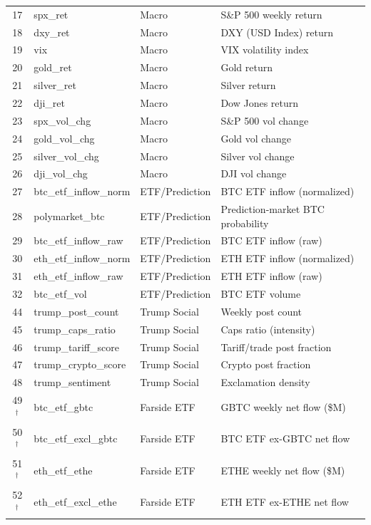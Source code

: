 \begin{table}[hp]
\begin{tabular}{clll}
17     & spx\_ret            & Macro           & S\&P 500 weekly return \\
18     & dxy\_ret            & Macro           & DXY (USD Index) return \\
19     & vix                 & Macro           & VIX volatility index \\
20     & gold\_ret           & Macro           & Gold return \\
21     & silver\_ret         & Macro           & Silver return \\
22     & dji\_ret            & Macro           & Dow Jones return \\
23     & spx\_vol\_chg       & Macro           & S\&P 500 vol change \\
24     & gold\_vol\_chg      & Macro           & Gold vol change \\
25     & silver\_vol\_chg    & Macro           & Silver vol change \\
26     & dji\_vol\_chg       & Macro           & DJI vol change \\
27     & btc\_etf\_inflow\_norm  & ETF/Prediction & BTC ETF inflow (normalized) \\
28     & polymarket\_btc         & ETF/Prediction & Prediction-market BTC probability \\
29     & btc\_etf\_inflow\_raw   & ETF/Prediction & BTC ETF inflow (raw) \\
30     & eth\_etf\_inflow\_norm  & ETF/Prediction & ETH ETF inflow (normalized) \\
31     & eth\_etf\_inflow\_raw   & ETF/Prediction & ETH ETF inflow (raw) \\
32     & btc\_etf\_vol           & ETF/Prediction & BTC ETF volume \\
44     & trump\_post\_count      & Trump Social   & Weekly post count \\
45     & trump\_caps\_ratio      & Trump Social   & Caps ratio (intensity) \\
46     & trump\_tariff\_score    & Trump Social   & Tariff/trade post fraction \\
47     & trump\_crypto\_score    & Trump Social   & Crypto post fraction \\
48     & trump\_sentiment        & Trump Social   & Exclamation density \\
49$^\dagger$ & btc\_etf\_gbtc       & Farside ETF & GBTC weekly net flow (\$M) \\
50$^\dagger$ & btc\_etf\_excl\_gbtc & Farside ETF & BTC ETF ex-GBTC net flow \\
51$^\dagger$ & eth\_etf\_ethe       & Farside ETF & ETHE weekly net flow (\$M) \\
52$^\dagger$ & eth\_etf\_excl\_ethe & Farside ETF & ETH ETF ex-ETHE net flow \\
\bottomrule
\end{tabular}
\end{table}


